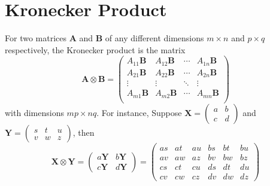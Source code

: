 \documentclass[conference,final,11pt,technote,onecolumn]{IEEEtran}\usepackage[]{graphicx}\usepackage[]{color}
\begin{document}
\section{Kronecker Product}
\label{term:kronecker_product}
For two matrices $\mathbf{A}$ and $\mathbf{B}$ of any different dimensions $m \times n$ and $p\times q$ respectively, the Kronecker product is the matrix 
\[ \mathbf{A} \otimes \mathbf{B} = \begin{pmatrix}
A_{11}\mathbf{B} & A_{12}\mathbf{B} & \cdots & A_{1n}\mathbf{B} \\
 A_{21}\mathbf{B} & A_{22}\mathbf{B} & \cdots & A_{2n}\mathbf{B} \\
\vdots & \vdots & \ddots & \vdots \\
 A_{m1}\mathbf{B} & A_{m2}\mathbf{B} & \cdots & A_{mn}\mathbf{B} \\
\end{pmatrix} \]
with dimensions $mp \times nq$. For instance, Suppose $\mathbf{X} = \begin{pmatrix}a & b\\ c & d\end{pmatrix}$ and $\mathbf{Y} = \begin{pmatrix}s & t & u\\ v & w & z\end{pmatrix}$, then
\[ 
\mathbf{X} \otimes \mathbf{Y} = \begin{pmatrix}
a\mathbf{Y} & b\mathbf{Y}\\ c\mathbf{Y} & d\mathbf{Y}
\end{pmatrix} = \begin{pmatrix}
as & at & au & bs & bt & bu\\
av & aw & az & bv & bw & bz\\
cs & ct & cu & ds & dt & du\\
cv & cw & cz & dv & dw & dz
\end{pmatrix}
\]
\end{document}
